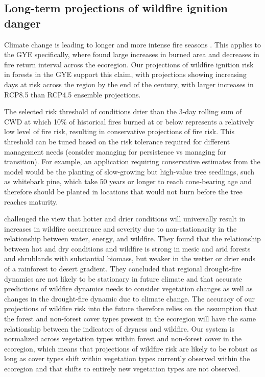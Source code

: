 \documentclass[11p]{article}
\begin{document}
\subsection{Long-term projections of wildfire ignition danger}

Climate change is leading to longer and more intense fire seasons \citep{abatzoglouImpactAnthropogenicClimate2016,abatzoglouProjectedIncreasesWestern2021,littellReviewRelationshipsDrought2016,jollyClimateinducedVariationsGlobal2015}. This applies to the GYE specifically, where \citet{westerlingContinuedWarmingCould2011} found large increases in burned area and decreases in fire return interval across the ecoregion. Our projections of wildfire ignition risk in forests in the GYE support this claim, with projections showing increasing days at risk across the region by the end of the century, with larger increases in RCP8.5 than RCP4.5 ensemble projections.

The selected risk threshold of conditions drier than the 3-day rolling sum of CWD at which 10\% of historical fires burned at or below represents a relatively low level of fire risk, resulting in conservative projections of fire risk. This threshold can be tuned based on the risk tolerance required for different management needs (consider managing for persistence vs managing for transition). For example, an application requiring conservative estimates from the model would be the planting of slow-growing but high-value tree seedlings, such as whitebark pine, which take 50 years or longer to reach cone-bearing age \citep{tombackWhitebarkPineCommunities2001} and therefore should be planted in locations that would not burn before the tree reaches maturity.

\citet{mckenzieClimateChangeEcohydrology2017} challenged the view that hotter and drier conditions will universally result in increases in wildfire occurrence and severity due to non-stationarity in the relationship between water, energy, and wildfire. They found that the relationship between hot and dry conditions and wildfire is strong in mesic and arid forests and shrublands with substantial biomass, but weaker in the wetter or drier ends of a rainforest to desert gradient. They concluded that regional drought-fire dynamics are not likely to be stationary in future climate and that accurate predictions of wildfire dynamics needs to consider vegetation changes  as well as changes in the drought-fire dynamic due to climate change. The accuracy of our projections of wildfire risk into the future therefore relies on the assumption that the forest and non-forest cover types present in the ecoregion will have the same relationship between the indicators of dryness and wildfire. Our system is normalized across vegetation types within forest and non-forest cover in the ecoregion, which means that projections of wildfire risk are likely to be robust as long as cover types shift within vegetation types currently observed within the ecoregion and that shifts to entirely new vegetation types are not observed.
\end{document}
